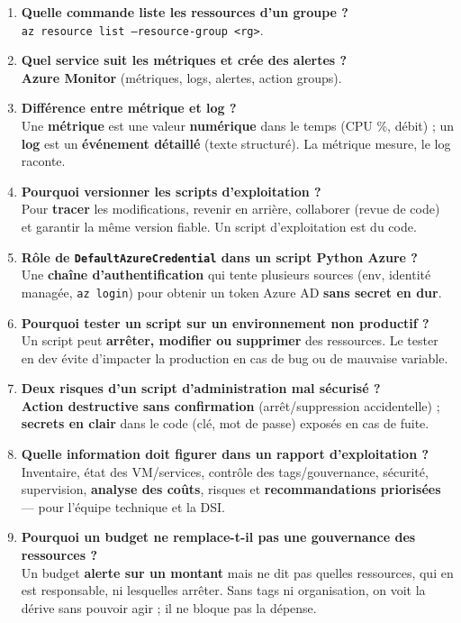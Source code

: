 \documentclass[11pt,a4paper]{article}
\newcommand{\code}[1]{\texttt{#1}}
\begin{document}
\begin{enumerate}[leftmargin=2.2em]
\item \textbf{Quelle commande liste les ressources d'un groupe ?}\\ \code{az resource list --resource-group <rg>}.
\item \textbf{Quel service suit les métriques et crée des alertes ?}\\ \textbf{Azure Monitor} (métriques, logs, alertes, action groups).
\item \textbf{Différence entre métrique et log ?}\\ Une \textbf{métrique} est une valeur \textbf{numérique} dans le temps (CPU \%, débit) ; un \textbf{log} est un \textbf{événement détaillé} (texte structuré). La métrique mesure, le log raconte.
\item \textbf{Pourquoi versionner les scripts d'exploitation ?}\\ Pour \textbf{tracer} les modifications, revenir en arrière, collaborer (revue de code) et garantir la même version fiable. Un script d'exploitation est du code.
\item \textbf{Rôle de \code{DefaultAzureCredential} dans un script Python Azure ?}\\ Une \textbf{chaîne d'authentification} qui tente plusieurs sources (env, identité managée, \code{az login}) pour obtenir un token Azure AD \textbf{sans secret en dur}.
\item \textbf{Pourquoi tester un script sur un environnement non productif ?}\\ Un script peut \textbf{arrêter, modifier ou supprimer} des ressources. Le tester en dev évite d'impacter la production en cas de bug ou de mauvaise variable.
\item \textbf{Deux risques d'un script d'administration mal sécurisé ?}\\ \textbf{Action destructive sans confirmation} (arrêt/suppression accidentelle) ; \textbf{secrets en clair} dans le code (clé, mot de passe) exposés en cas de fuite.
\item \textbf{Quelle information doit figurer dans un rapport d'exploitation ?}\\ Inventaire, état des VM/services, contrôle des tags/gouvernance, sécurité, supervision, \textbf{analyse des coûts}, risques et \textbf{recommandations priorisées} — pour l'équipe technique et la DSI.
\item \textbf{Pourquoi un budget ne remplace-t-il pas une gouvernance des ressources ?}\\ Un budget \textbf{alerte sur un montant} mais ne dit pas quelles ressources, qui en est responsable, ni lesquelles arrêter. Sans tags ni organisation, on voit la dérive sans pouvoir agir ; il ne bloque pas la dépense.

\end{enumerate}
\end{document}
